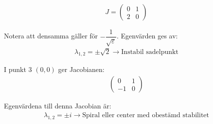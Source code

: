 \begin{equation*}
  \begin{gathered}
    J = \begin{pmatrix}0&1\\2&0\end{pmatrix}
  \end{gathered}
\end{equation*}\par
\noindent Notera att densamma gäller för $-\dfrac{1}{\sqrt{\varepsilon}}$. Egenvärden ges av:
\begin{equation*}
  \begin{gathered}
    \lambda_{1,2} = \pm\sqrt{2}\rightarrow\text{Instabil sadelpunkt}
  \end{gathered}
\end{equation*}
\par\bigskip
\noindent I punkt 3 $(0,0)$ ger Jacobianen:
\begin{equation*}
  \begin{gathered}
    \begin{pmatrix}0&1\\-1&0\end{pmatrix}
  \end{gathered}
\end{equation*}\par
\noindent Egenvärdena till denna Jacobian är:
\begin{equation*}
  \begin{gathered}
    \lambda_{1,2}=\pm i\rightarrow\text{Spiral eller center med obestämd stabilitet}
  \end{gathered}
\end{equation*}
